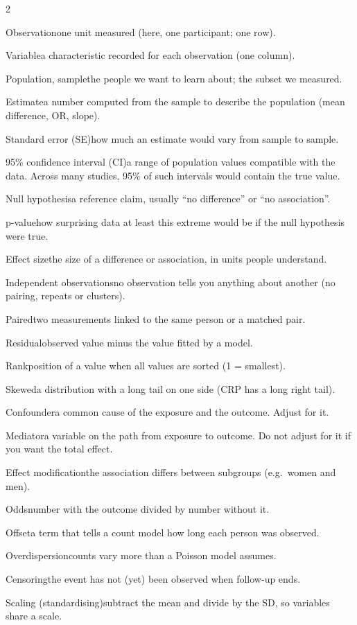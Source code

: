 \documentclass[style1, note, nocover]{neudata}
\newcommand{\sect}[1]{\needspace{6\baselineskip}\vspace{4pt}{\large\bfseries\color{cnavy}#1}\par\vspace{1pt}{\color{cblue}\rule{\linewidth}{0.8pt}}\par}
\newcommand{\lab}[1]{{\color{cblue}#1}\enspace}
\begin{document}
\begin{multicols}{2}
\sect{Glossary}
{\small
\lab{Observation}one unit measured (here, one participant; one row).\par
\lab{Variable}a characteristic recorded for each observation (one column).\par
\lab{Population, sample}the people we want to learn about; the subset we measured.\par
\lab{Estimate}a number computed from the sample to describe the population (mean difference, OR, slope).\par
\lab{Standard error (SE)}how much an estimate would vary from sample to sample.\par
\lab{95\% confidence interval (CI)}a range of population values compatible with the data. Across many studies, 95\% of such intervals would contain the true value.\par
\lab{Null hypothesis}a reference claim, usually ``no difference'' or ``no association''.\par
\lab{p-value}how surprising data at least this extreme would be if the null hypothesis were true.\par
\lab{Effect size}the size of a difference or association, in units people understand.\par
\lab{Independent observations}no observation tells you anything about another (no pairing, repeats or clusters).\par
\lab{Paired}two measurements linked to the same person or a matched pair.\par
\lab{Residual}observed value minus the value fitted by a model.\par
\lab{Rank}position of a value when all values are sorted (1 = smallest).\par
\lab{Skewed}a distribution with a long tail on one side (CRP has a long right tail).\par
\lab{Confounder}a common cause of the exposure and the outcome. Adjust for it.\par
\lab{Mediator}a variable on the path from exposure to outcome. Do not adjust for it if you want the total effect.\par
\lab{Effect modification}the association differs between subgroups (e.g.\ women and men).\par
\lab{Odds}number with the outcome divided by number without it.\par
\lab{Offset}a term that tells a count model how long each person was observed.\par
\lab{Overdispersion}counts vary more than a Poisson model assumes.\par
\lab{Censoring}the event has not (yet) been observed when follow-up ends.\par
\lab{Scaling (standardising)}subtract the mean and divide by the SD, so variables share a scale.\par
}


\end{multicols}
\end{document}
